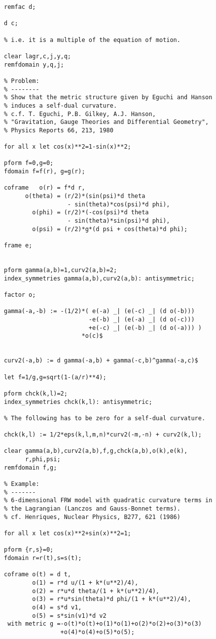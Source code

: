 {\begin{verbatim}
remfac d;

d c;

% i.e. it is a multiple of the equation of motion.

clear lagr,c,j,y,q;
remfdomain y,q,j;

% Problem:
% --------
% Show that the metric structure given by Eguchi and Hanson
% induces a self-dual curvature.
% c.f. T. Eguchi, P.B. Gilkey, A.J. Hanson,
% "Gravitation, Gauge Theories and Differential Geometry",
% Physics Reports 66, 213, 1980

for all x let cos(x)**2=1-sin(x)**2;

pform f=0,g=0;
fdomain f=f(r), g=g(r);

coframe   o(r) = f*d r,
      o(theta) = (r/2)*(sin(psi)*d theta
                  - sin(theta)*cos(psi)*d phi),
        o(phi) = (r/2)*(-cos(psi)*d theta
                  - sin(theta)*sin(psi)*d phi),
        o(psi) = (r/2)*g*(d psi + cos(theta)*d phi);

frame e;


pform gamma(a,b)=1,curv2(a,b)=2;
index_symmetries gamma(a,b),curv2(a,b): antisymmetric;

factor o;

gamma(-a,-b) := -(1/2)*( e(-a) _| (e(-c) _| (d o(-b)))
                        -e(-b) _| (e(-a) _| (d o(-c)))
                        +e(-c) _| (e(-b) _| (d o(-a))) )
                      *o(c)$


curv2(-a,b) := d gamma(-a,b) + gamma(-c,b)^gamma(-a,c)$

let f=1/g,g=sqrt(1-(a/r)**4);

pform chck(k,l)=2;
index_symmetries chck(k,l): antisymmetric;

% The following has to be zero for a self-dual curvature.

chck(k,l) := 1/2*eps(k,l,m,n)*curv2(-m,-n) + curv2(k,l);

clear gamma(a,b),curv2(a,b),f,g,chck(a,b),o(k),e(k),
      r,phi,psi;
remfdomain f,g;

% Example:
% -------
% 6-dimensional FRW model with quadratic curvature terms in
% the Lagrangian (Lanczos and Gauss-Bonnet terms).
% cf. Henriques, Nuclear Physics, B277, 621 (1986)

for all x let cos(x)**2+sin(x)**2=1;

pform {r,s}=0;
fdomain r=r(t),s=s(t);

coframe o(t) = d t,
        o(1) = r*d u/(1 + k*(u**2)/4),
        o(2) = r*u*d theta/(1 + k*(u**2)/4),
        o(3) = r*u*sin(theta)*d phi/(1 + k*(u**2)/4),
        o(4) = s*d v1,
        o(5) = s*sin(v1)*d v2
 with metric g =-o(t)*o(t)+o(1)*o(1)+o(2)*o(2)+o(3)*o(3)
                +o(4)*o(4)+o(5)*o(5);


\end{verbatim}}
